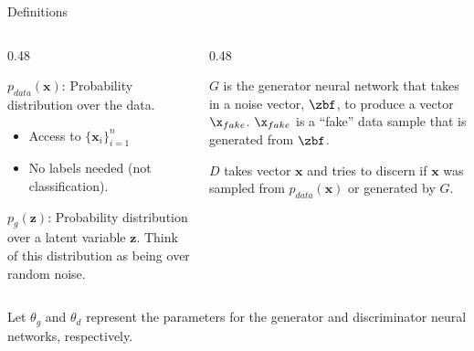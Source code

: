 \documentclass[aspectratio=169,xcolor=dvipsnames,svgnames,x11names,fleqn]{beamer}
\begin{document}
\begin{frame}{Definitions}

\footnotesize

    \begin{columns}[T, totalwidth=\textwidth]
        \begin{column}{0.48\textwidth}
            \begin{tcolorbox}[colback=datagreen!5, colframe=datagreen, title=\textbf{Data Distribution}, fonttitle=\bfseries\small, arc=1mm]
                 $p_{data}(\mathbf{x})$: Probability distribution over the data. 
                \begin{itemize}
                    \item Access to $\{\mathbf{x}_i\}_{i=1}^n$
                    \item No labels needed (not classification).
                \end{itemize}
            \end{tcolorbox}
            
            \pause
            \begin{tcolorbox}[colback=gray!5, colframe=gray!60, title=\textbf{Latent Variable}, fonttitle=\bfseries\small, arc=1mm]
                 $p_{g}(\mathbf{z})$: Probability distribution over a latent variable $\mathbf{z}$. Think of this distribution as being over random noise.
            \end{tcolorbox}
        \end{column}

        \begin{column}{0.48\textwidth}
            \pause
            \begin{tcolorbox}[colback=genblue!5, colframe=genblue, title=\textbf{Generator} $G(\mathbf{z})$, fonttitle=\bfseries\small, arc=1mm]
                 $G$ is the generator neural network that takes in a noise vector, $\zbf$, to produce a vector $\x_{fake}$. $\x_{fake}$ is a ``fake'' data sample that is generated from $\zbf$. 
            \end{tcolorbox}

            \pause
            \begin{tcolorbox}[colback=discred!5, colframe=discred, title=\textbf{Discriminator} $D(\mathbf{x})$, fonttitle=\bfseries\small, arc=1mm]
                 $D$ takes vector $\mathbf{x}$ and tries to discern if $\mathbf{x}$ was sampled from $p_{data}(\mathbf{x})$ or generated by $G$.
            \end{tcolorbox}
        \end{column}
    \end{columns}

    \pause
    
    \begin{tcolorbox}[enhanced, sharp corners, boxrule=0pt, frame hidden, colback=yellow!10, borderline west={2pt}{0pt}{orange}]
         Let $\theta_g$ and $\theta_d$ represent the parameters for the generator and discriminator neural networks, respectively.
    \end{tcolorbox}
\end{frame}
\end{document}
